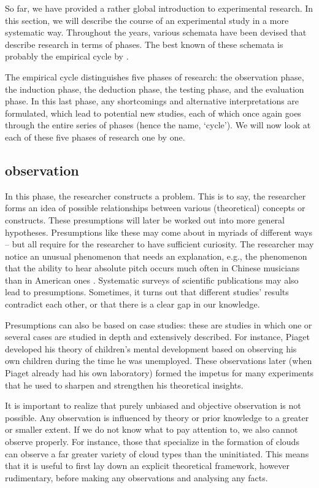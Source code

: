\documentclass[
]{book}
\begin{document}
So far, we have provided a rather global introduction to experimental research. In this section, we will describe the course of an experimental study in a more systematic way. Throughout the years, various schemata have been devised that describe research in terms of phases. The best known of these schemata is probably the empirical cycle by \citet{Groot61}.

The empirical cycle distinguishes five phases of research: the observation phase, the induction phase, the deduction phase, the testing phase, and the evaluation phase. In this last phase, any shortcomings and alternative interpretations are formulated, which lead to potential new studies, each of which once again goes through the entire series of phases (hence the name, `cycle'). We will now look at each of these five phases of research one by one.

\hypertarget{observation}{%
\subsection{observation}\label{observation}}

In this phase, the researcher constructs a problem. This is to say, the researcher forms an idea of possible relationships between various (theoretical) concepts or constructs. These presumptions will later be worked out into more general hypotheses. Presumptions like these may come about in myriads of different ways -- but all require for the researcher to have sufficient curiosity. The researcher may notice an unusual phenomenon that needs an explanation, e.g., the phenomenon that the ability to hear absolute pitch occurs much often in Chinese musicians than in American ones \citep{Deut06}.
Systematic surveys of scientific publications may also lead to presumptions. Sometimes, it turns out that different studies' results contradict each other, or that there is a clear gap in our knowledge.

Presumptions can also be based on case studies: these are studies in which one or several cases are studied in depth and extensively described. For instance, Piaget developed his theory of children's mental development based on observing his own children during the time he was unemployed. These observations later (when Piaget already had his own laboratory) formed the impetus for many experiments that he used to sharpen and strengthen his theoretical insights.

It is important to realize that purely unbiased and objective observation is not possible. Any observation is influenced by theory or prior knowledge to a greater or smaller extent. If we do not know what to pay attention to, we also cannot observe properly. For instance, those that specialize in the formation of clouds can observe a far greater variety of cloud types than the uninitiated. This means that it is useful to first lay down an explicit theoretical framework, however rudimentary, before making any observations and analysing any facts.
\end{document}
